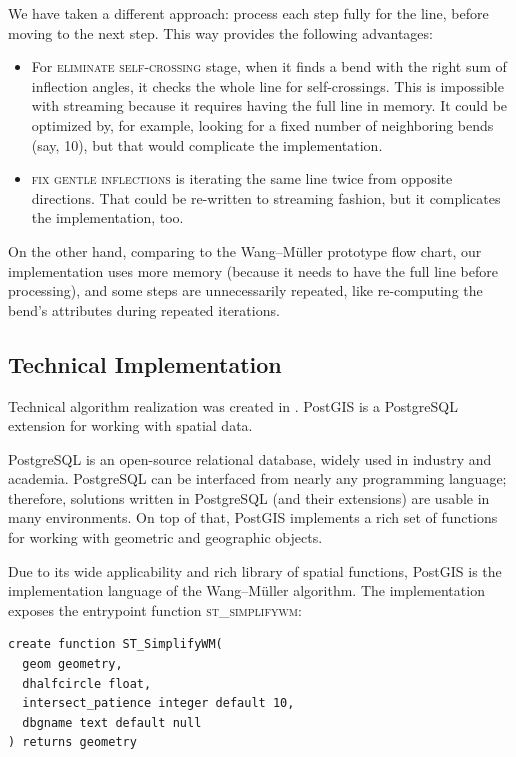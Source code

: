 \documentclass[a4paper]{article}
\newcommand{\titlecite}[1]{\citetitle{#1}\cite{#1}}
\newcommand{\WM}{Wang--M{\"u}ller}
\begin{document}
We have taken a different approach: process each step fully for the line,
before moving to the next step. This way provides the following advantages:

\begin{itemize}

    \item For \textsc{eliminate self-crossing} stage, when it finds a bend with
        the right sum of inflection angles, it checks the whole line for
        self-crossings. This is impossible with streaming because it requires
        having the full line in memory. It could be optimized by, for example,
        looking for a fixed number of neighboring bends (say, 10), but that
        would complicate the implementation.

    \item \textsc{fix gentle inflections} is iterating the same line twice from
        opposite directions. That could be re-written to streaming fashion, but
        it complicates the implementation, too.

\end{itemize}
On the other hand, comparing to the {\WM} prototype flow chart, our
implementation uses more memory (because it needs to have the full line before
processing), and some steps are unnecessarily repeated, like re-computing the
bend's attributes during repeated iterations.

\subsection{Technical Implementation}
\label{sec:technical-implementation}

Technical algorithm realization was created in \titlecite{postgis311}. PostGIS
is a PostgreSQL extension for working with spatial data.

PostgreSQL is an open-source relational database, widely used in industry and
academia. PostgreSQL can be interfaced from nearly any programming language;
therefore, solutions written in PostgreSQL (and their extensions) are usable in
many environments. On top of that, PostGIS implements a rich set of
functions\cite{postgisref} for working with geometric and geographic objects.

Due to its wide applicability and rich library of spatial functions, PostGIS is
the implementation language of the {\WM} algorithm. The implementation exposes
the entrypoint function \textsc{st\_simplifywm}:

\begin{verbatim}
create function ST_SimplifyWM(
  geom geometry,
  dhalfcircle float,
  intersect_patience integer default 10,
  dbgname text default null
) returns geometry
\end{verbatim}
\end{document}
